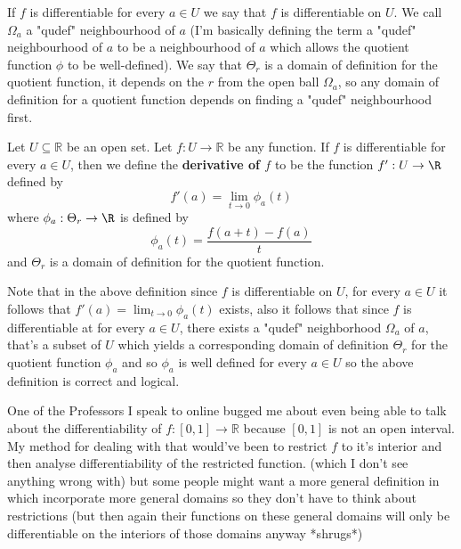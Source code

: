 	
	\begin{remark}
		If $f$ is differentiable for every $a \in U$ we say that $f$ is differentiable on $U$. We call $\Omega_a$ a "qudef" neighbourhood of $a$ (I'm basically defining the term a "qudef" neighbourhood of $a$ to be a neighbourhood of $a$ which allows the quotient function $\phi$ to be well-defined). We say that $\Theta_r$ is a domain of definition for the quotient function, it depends on the $r$ from the open ball $\Omega_a$, so any domain of definition for a quotient function depends on finding a "qudef" neighbourhood first.
	\end{remark}
	
	
	\begin{definition}
		Let $U \subseteq \mathbb{R}$ be an open set. Let $f : U \to \mathbb{R}$ be any function. If $f$ is differentiable for every $a \in U$, then we define the \textbf{derivative of $f$} to be the function  $f' : U \to \R$ defined by $$f'(a) = \lim_{t \to 0}\phi_{a}(t)$$ where $\phi_a : \Theta_r \to \R$ is defined by $$\phi_a(t) = \frac{f(a+t)-f(a)}{t}$$ and $\Theta_r$ is a domain of definition for the quotient function.
	\end{definition}
	
	
	\begin{remark}
		Note that in the above definition since $f$ is differentiable on $U$, for every $a \in U$ it follows that $f'(a) = \lim_{t \to 0}\phi_{a}(t)$ exists, also it follows that since $f$ is differentiable at for every $a \in U$, there exists a "qudef" neighborhood $\Omega_a$ of $a$, that's a subset of $U$ which yields a corresponding domain of definition $\Theta_r$ for the quotient function $\phi_a$ and so $\phi_a$ is well defined for every $a \in U$  so the above definition is correct and logical. 
	\end{remark}
	
	
	One of the Professors I speak to online bugged me about even being able to talk  about the differentiability of $f : [0, 1] \to \mathbb{R}$ because $[0, 1]$ is not an open interval. My method for dealing with that would've been to restrict $f$ to it's interior and then analyse differentiability of the restricted function. (which I don't see anything wrong with) but some people might want a more general definition in which incorporate more general domains so they don't have to think about restrictions (but then again their functions on these general domains will only be differentiable on the interiors of those domains anyway *shrugs*)
	
